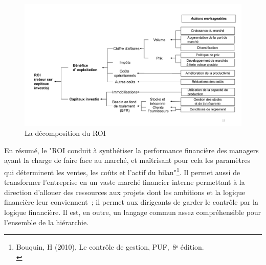 \documentclass{tufte-handout}
\begin{document}
\begin{enumerate}
\begin{figure}[htbp]
\centering
\includegraphics[width=.9\linewidth]{./img/roidetail.pdf}
\caption{La décomposition du ROI}
\end{figure}

En résumé, le "ROI conduit à synthétiser la performance financière des managers ayant la charge de faire face au marché, et maîtrisant pour cela les paramètres qui déterminent les ventes, les coûts et l'actif du bilan"\footnote{Bouquin, H (2010), Le contrôle de gestion, PUF, 8ᵉ édition.\\}. Il permet aussi de transformer l'entreprise en un vaste marché financier interne permettant à la direction d'allouer des ressources aux projets dont les ambitions et la logique financière leur conviennent ; il permet aux dirigeants de garder le contrôle par la logique financière. Il est, en outre, un langage commun assez compréhensible pour l'ensemble de la hiérarchie.\\


\end{enumerate}
\end{document}

